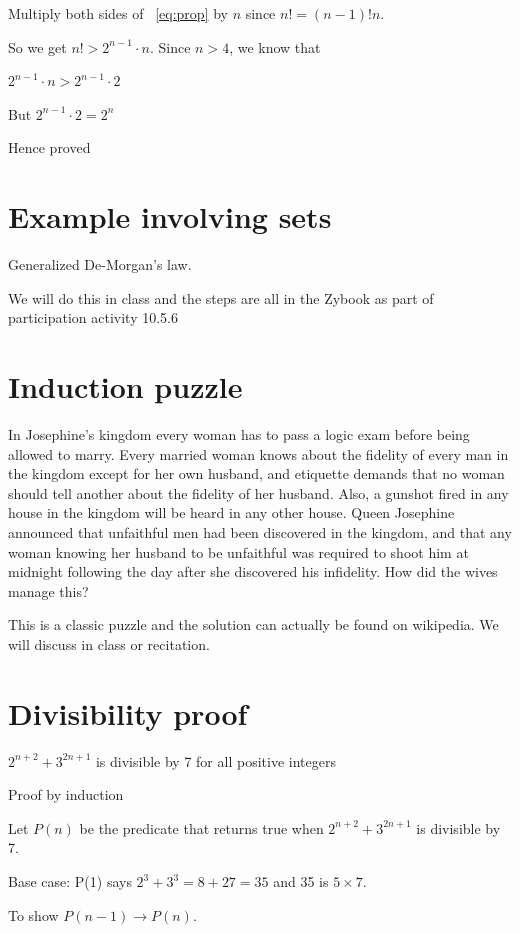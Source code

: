 \documentclass[12pt]{article}
\begin{document}
Multiply both sides of ~\ref{eq:prop} by $n$ since $n! = (n-1)!n$.

So we get $n! > 2^{n-1} \cdot n$. Since $n >4$, we know that 

$2^{n-1} \cdot n > 2^{n-1} \cdot 2$ 

But $2^{n-1} \cdot 2 = 2^n$

Hence proved

\section*{Example involving sets}

Generalized De-Morgan's law.

We will do this in class and the steps are all in the Zybook as part of participation activity 10.5.6

\section*{Induction puzzle}

 In Josephine's kingdom every woman has to pass a logic exam before being allowed to marry. Every married woman knows about the fidelity of every man in the kingdom except for her own husband, and etiquette demands that no woman should tell another about the fidelity of her husband. Also, a gunshot fired in any house in the kingdom will be heard in any other house. Queen Josephine announced that unfaithful men had been discovered in the kingdom, and that any woman knowing her husband to be unfaithful was required to shoot him at midnight following the day after she discovered his infidelity. How did the wives manage this?
 
This is a classic puzzle and the solution can actually be found on wikipedia. We will discuss in class or recitation.

\section*{Divisibility proof}

$2^{n+2} + 3^{2n+1}$ is divisible by 7 for all positive integers

Proof by induction

Let $P(n)$ be the predicate that returns true when $2^{n+2} + 3^{2n+1}$ is divisible by 7.

Base case: P(1) says $2^3 + 3^3 = 8 + 27 = 35$ and 35 is $5 \times 7$.

To show $P(n-1) \rightarrow P(n)$.
\end{document}
